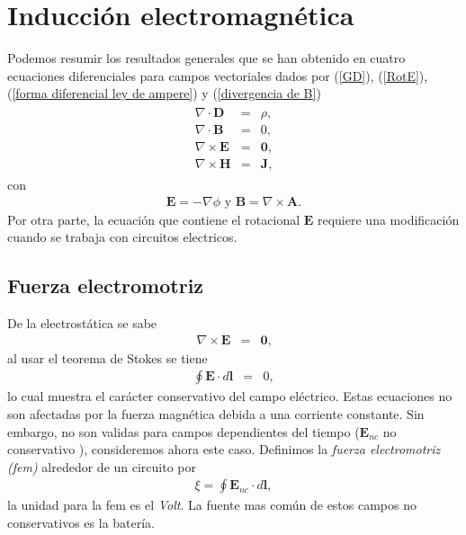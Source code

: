 \chapter{Inducci\'on electromagn\'etica}
Podemos resumir los resultados generales que se han obtenido en cuatro ecuaciones diferenciales para campos vectoriales dados por (\ref{GD}), (\ref{RotE}), (\ref{forma diferencial ley de ampere}) y (\ref{divergencia de B})
\begin{eqnarray}\label{ecs electrostatica}
\begin{split}
\nabla\cdot\textbf{D}&=&\rho,\\
\nabla\cdot\textbf{B}&=&0,\\
\nabla\times\textbf{E}&=&\textbf{0},\\
\nabla\times\textbf{H}&=&\textbf{J},
\end{split}
\end{eqnarray}
con
\begin{eqnarray}
\textbf{E}=-\nabla\phi \,\,\mbox{y}\,\,\textbf{B}=\nabla\times\textbf{A}.\label{PotencialfA}
\end{eqnarray}
Por otra parte, la ecuaci\'on que contiene el rotacional $\textbf{E}$ requiere una modificaci\'on cuando se trabaja con circuitos electricos.


\section{Fuerza electromotriz}
De la electrost\'atica se sabe
\begin{eqnarray}
\nabla\times\textbf{E}&=&\textbf{0},\nonumber
\end{eqnarray}
al usar el teorema de Stokes se tiene
\begin{eqnarray}
\oint\textbf{E}\cdot d\textbf{l}&=&0,\nonumber
\end{eqnarray}
lo cual muestra el car\'acter conservativo del campo el\'ectrico. Estas ecuaciones no son afectadas por la fuerza magn\'etica debida a una corriente constante. Sin embargo, no son validas para campos dependientes del tiempo ($\textbf{E}_{nc}$ no conservativo ), consideremos ahora este caso. Definimos la \emph{fuerza electromotriz (fem)} alrededor de un circuito por
\begin{eqnarray}
\xi=\oint\textbf{E}_{nc}\cdot d\textbf{l},\label{fza electrom}
\end{eqnarray}
la unidad para la fem es el \emph{Volt}. La fuente mas com\'un de estos campos no conservativos es la bater\'ia.



